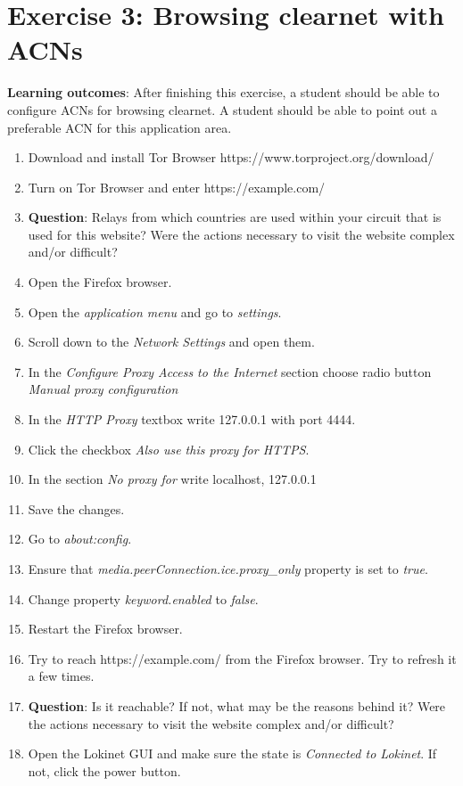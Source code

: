 \section*{Exercise 3: Browsing clearnet with ACNs}
\textbf{Learning outcomes}: After finishing this exercise, a student should be able to configure ACNs for browsing clearnet. A student should be able to point out a preferable ACN for this application area.
\begin{enumerate}
    \item Download and install Tor Browser https://www.torproject.org/download/
    \item Turn on Tor Browser and enter https://example.com/
    \item \textbf{Question}: Relays from which countries are used within your circuit that is used for this website? Were the actions necessary to visit the website complex and/or difficult?
    \item Open the Firefox browser.
    \item Open the \textit{application menu} and go to \textit{settings}.
    \item Scroll down to the \textit{Network Settings} and open them.
    \item In the \textit{Configure Proxy Access to the Internet} section choose radio button \textit{Manual proxy configuration }
    \item In the \textit{HTTP Proxy} textbox write 127.0.0.1 with port 4444.
    \item Click the checkbox \textit{Also use this proxy for HTTPS}.
    \item In the section \textit{No proxy for} write localhost, 127.0.0.1
    \item Save the changes.
    \item Go to \textit{about:config}.
    \item Ensure that \textit{media.peerConnection.ice.proxy\_only} property is set to \textit{true}.
    \item Change property \textit{keyword.enabled} to \textit{false}.
    \item Restart the Firefox browser.
    \item Try to reach https://example.com/ from the Firefox browser. Try to refresh it a few times.
    \item \textbf{Question}: Is it reachable? If not, what may be the reasons behind it? Were the actions necessary to visit the website complex and/or difficult?
    \item Open the Lokinet GUI and make sure the state is \textit{Connected to Lokinet}. If not, click the power button.

\end{enumerate}

